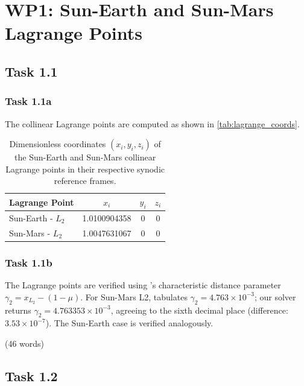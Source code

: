 \chapter{WP1: Sun-Earth and Sun-Mars Lagrange Points}
\label{chapter:wp1}

\section{Task 1.1}

\subsection{Task 1.1a}

The collinear Lagrange points are computed as shown in \autoref{tab:lagrange_coords}.

\begin{table}[H]
  \centering
  \caption{Dimensionless coordinates $(x_i, y_i, z_i)$ of the Sun-Earth and Sun-Mars collinear Lagrange points in their respective synodic reference frames.}
  \label{tab:lagrange_coords}
  \begin{tabular}{@{} l S[table-format=1.10] c c @{}}
    \toprule
    \textbf{Lagrange Point} & {$x_i$} & {$y_i$} & {$z_i$} \\
    \midrule
    Sun-Earth - $L_2$ & 1.0100904358 & 0 & 0 \\
    Sun-Mars  - $L_2$ & 1.0047631067 & 0 & 0 \\
    \bottomrule
  \end{tabular}
\end{table}

\subsection{Task 1.1b}

The Lagrange points are verified using \textcite{wakker2015fundamentals}'s characteristic distance parameter $\gamma_2 = x_{L_2} - (1-\mu)$.
For Sun-Mars L2, \citeauthor{wakker2015fundamentals} tabulates $\gamma_2 = 4.763 \times 10^{-3}$; our solver returns $\gamma_2 = 4.763353 \times 10^{-3}$, agreeing to the sixth decimal place (difference: $3.53 \times 10^{-7}$).
The Sun-Earth case is verified analogously.

(46 words)

\section{Task 1.2} \label{sec:1.2}

